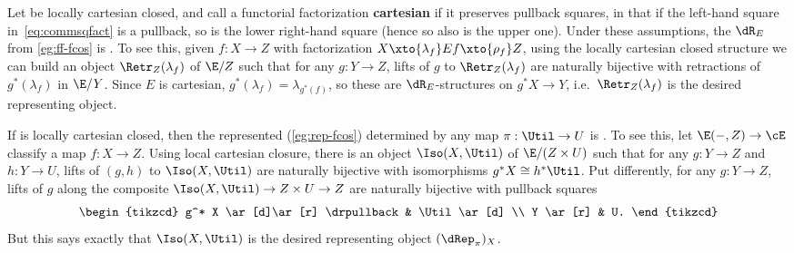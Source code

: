 \begin{eg}\label{eg:cart-ff-local}
  Let \E be locally cartesian closed, and call a functorial factorization \textbf{cartesian} if it preserves pullback squares, in that if the left-hand square in~\eqref{eq:commsqfact} is a pullback, so is the lower right-hand square (hence so also is the upper one).
  Under these assumptions, the \nfs $\dR_E$ from \cref{eg:ff-fcos} is \local.
  To see this, given $f:X\to Z$ with factorization $X\xto{\lambda_f} E f\xto{\rho_f} Z$, using the locally cartesian closed structure we can build an object $\Retr_Z(\lambda_f)$ of $\E/Z$ such that for any $g:Y\to Z$, lifts of $g$ to $\Retr_Z(\lambda_f)$ are naturally bijective with retractions of $g^*(\lambda_f)$ in $\E/Y$.
  Since $E$ is cartesian, $g^*(\lambda_f) = \lambda_{g^*(f)}$, so these are $\dR_E$-structures on $g^*X \to Y$, i.e.\ $\Retr_Z(\lambda_f)$ is the desired representing object.
\end{eg}

\begin{eg}\label{eg:rep-local}
  If \E is locally cartesian closed, then the represented \nfs (\cref{eg:rep-fcos}) determined by any map $\pi:\Util\to U$ is \local.
  To see this, let $\E(-,Z) \to \cE$ classify a map $f:X\to Z$.
  Using local cartesian closure, there is an object $\Iso(X,\Util)$ of $\E/(Z\times U)$ such that for any $g:Y\to Z$ and $h:Y\to U$, lifts of $(g,h)$ to $\Iso(X,\Util)$ are naturally bijective with isomorphisms $g^*X \cong h^*\Util$.
  Put differently, for any $g:Y\to Z$, lifts of $g$ along the composite $\Iso(X,\Util) \to Z\times U \to Z$ are naturally bijective with pullback squares
  \[
    \begin{tikzcd}
      g^* X \ar[d]\ar[r] \drpullback & \Util \ar[d] \\
      Y \ar[r] & U.
    \end{tikzcd}
  \]
  But this says exactly that $\Iso(X,\Util)$ is the desired representing object $(\dRep_\pi)_X$.
\end{eg}


